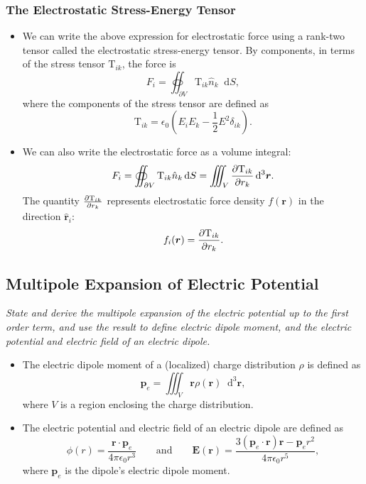 \documentclass[11pt, a4paper]{article}
\newcommand{\diff}{\mathop{}\!\mathrm{d}} %
\newcommand{\dr}{\diff^{3} \r}  %
\renewcommand{\vec}[1]{\bm{#1}} %
\newcommand{\uvec}[1]{\hat{\vec{#1}}} %
\renewcommand{\r}{\vec{r}}
\newcommand{\E}{\vec{E}} %
\newcommand{\TT}{\mathrm{T}}  %
\newcommand{\ee}{\epsilon_{0}}  %
\newcommand{\pe}{\vec{p}_{e}}  %
\begin{document}
\subsubsection{The Electrostatic Stress-Energy Tensor}
\begin{itemize}
	\item We can write the above expression for electrostatic force using a rank-two tensor called the electrostatic stress-energy tensor. By components, in terms of the stress tensor $ \TT_{ik} $, the force is
	\begin{equation*}
		F_{i} = \oiint_{\partial V} \TT_{ik} \hat{n}_{k} \diff S,
	\end{equation*}
	where the components of the stress tensor are defined as
	\begin{equation*}
		\TT_{ik} = \ee \left(E_{i}E_{k} - \frac{1}{2}E^{2}\delta_{ik} \right).
	\end{equation*}
	
	\item We can also write the electrostatic force as a volume integral:
	\begin{equation*}
		F_{i} = \oiint_{\partial V} \TT_{ik} \hat{n}_{k} \diff S = \iiint_{V} \pdv{\TT_{ik}}{r_{k}} \dr.
	\end{equation*}
	The quantity $ \pdv{\TT_{ik}}{r_{k}} $ represents electrostatic force density $ f(\r) $ in the direction $ \uvec{r}_{i} $:
	\begin{equation*}
		f_{i}(\r) = \pdv{\TT_{ik}}{r_{k}}.
	\end{equation*}
	
\end{itemize}
    

\subsection{Multipole Expansion of Electric Potential}
\textit{State and derive the multipole expansion of the electric potential up to the first order term, and use the result to define electric dipole moment, and the electric potential and electric field of an electric dipole.}

\begin{itemize}
    \item The electric dipole moment of a (localized) charge distribution $ \rho $ is defined as
    \begin{equation*}
        \pe = \iiint_{V} \r \rho(\r) \dr,
    \end{equation*}
    where $ V $ is a region enclosing the charge distribution.

    \item The electric potential and electric field of an electric dipole are defined as
    \begin{equation*}
        \phi(r) = \frac{\r \cdot \pe}{4\pi \ee r^{3}} \qquad \text{and} \qquad \E(\r) = \frac{3(\pe \cdot \r)\r - \pe r^{2}}{4 \pi \ee r^{5}},
    \end{equation*}
    where $ \pe $ is the dipole's electric dipole moment.
    
\end{itemize}
\end{document}
